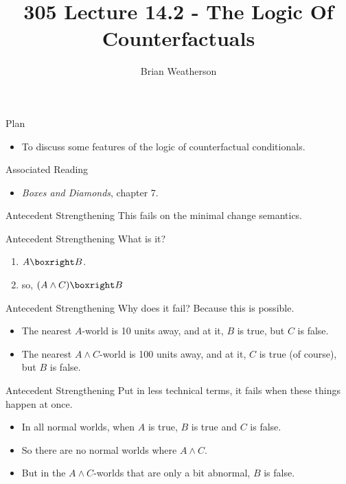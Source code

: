 \documentclass[
  ignorenonframetext,
]{beamer}
\title{305 Lecture 14.2 - The Logic Of Counterfactuals}
\author{Brian Weatherson}
\date{}
\providecommand{\tightlist}{%
  \setlength{\itemsep}{0pt}\setlength{\parskip}{0pt}}
\renewcommand{\,}{\text{, }}
\begin{document}
\frame{\titlepage}

\begin{frame}{Plan}
\protect\hypertarget{plan}{}
\begin{itemize}
\tightlist
\item
  To discuss some features of the logic of counterfactual conditionals.
\end{itemize}
\end{frame}

\begin{frame}{Associated Reading}
\protect\hypertarget{associated-reading}{}
\begin{itemize}
\tightlist
\item
  \emph{Boxes and Diamonds}, chapter 7.
\end{itemize}
\end{frame}

\begin{frame}{Antecedent Strengthening}
\protect\hypertarget{antecedent-strengthening}{}
This fails on the minimal change semantics.
\end{frame}

\begin{frame}{Antecedent Strengthening}
\protect\hypertarget{antecedent-strengthening-1}{}
What is it?

\begin{enumerate}
\tightlist
\item
  \(A \boxright B\).
\item
  so, \((A \wedge C) \boxright B\)
\end{enumerate}
\end{frame}

\begin{frame}{Antecedent Strengthening}
\protect\hypertarget{antecedent-strengthening-2}{}
Why does it fail? Because this is possible.

\begin{itemize}
\tightlist
\item
  The nearest \(A\)-world is 10 units away, and at it, \(B\) is true,
  but \(C\) is false.
\item
  The nearest \(A \wedge C\)-world is 100 units away, and at it, \(C\)
  is true (of course), but \(B\) is false.
\end{itemize}
\end{frame}

\begin{frame}{Antecedent Strengthening}
\protect\hypertarget{antecedent-strengthening-3}{}
Put in less technical terms, it fails when these things happen at once.

\begin{itemize}[<+->]
\tightlist
\item
  In all normal worlds, when \(A\) is true, \(B\) is true and \(C\) is
  false.
\item
  So there are no normal worlds where \(A \wedge C\).
\item
  But in the \(A \wedge C\)-worlds that are only a bit abnormal, \(B\)
  is false.
\end{itemize}
\end{frame}
\end{document}
